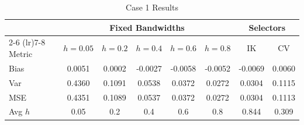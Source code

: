 \begin{table}[t!]
\centering
\caption{Case 1 Results}
\label{tab:case1}
\begin{tabular}{l ccccc cc}
\toprule
& \multicolumn{5}{c}{\textbf{Fixed Bandwidths}} & \multicolumn{2}{c}{\textbf{Selectors}} \\
\cmidrule(lr){2-6} \cmidrule(lr){7-8}
Metric & $h=0.05$ & $h=0.2$ & $h=0.4$ & $h=0.6$ & $h=0.8$ & IK & CV \\ 
\midrule
Bias & 0.0051 & 0.0002 & -0.0027 & -0.0058 & -0.0052 & -0.0069 & 0.0060 \\ 
Var & 0.4360 & 0.1091 & 0.0538 & 0.0372 & 0.0272 & 0.0304 & 0.1115 \\ 
MSE & 0.4351 & 0.1089 & 0.0537 & 0.0372 & 0.0272 & 0.0304 & 0.1113 \\ 
\addlinespace
Avg $h$ & 0.05 & 0.2 & 0.4 & 0.6 & 0.8 & 0.844 & 0.309 \\ 
\bottomrule
\end{tabular}
\end{table}
